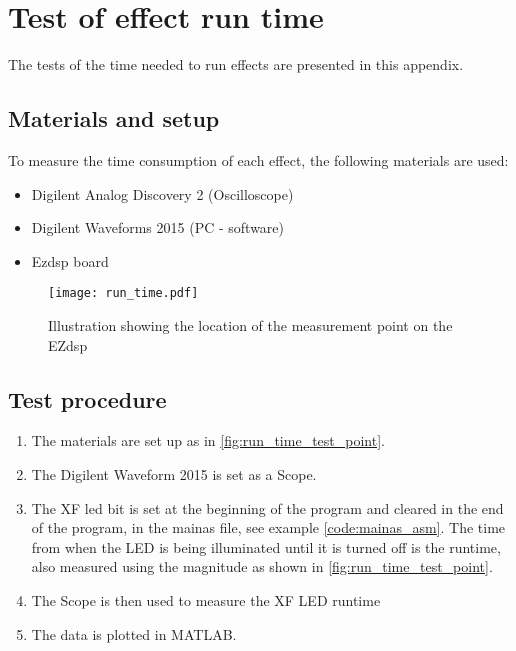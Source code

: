 \chapter{Test of effect run time}\label{app:effect_run_time}

The tests of the time needed to run effects are presented in this appendix.

\section*{Materials and setup}
To measure the time consumption of each effect, the following materials are used:
\begin{itemize}
\item Digilent Analog Discovery 2 (Oscilloscope)
\item Digilent Waveforms 2015 (PC - software)
\item Ezdsp board
\end{itemize}


\begin{figure}[htbp!]
	\centering
		\texttt{[image: run\_time.pdf]}
		\caption{Illustration showing the location of the measurement point on the EZdsp}
		\label{fig:run_time_test_point}
\end{figure}


\section*{Test procedure}
\begin{enumerate}
\item The materials are set up as in \autoref{fig:run_time_test_point}.
\item The Digilent Waveform 2015 is set as a Scope.
\item  The XF led bit is set at the beginning of the program and cleared in the end of the program, in the mainas file, see example \autoref{code:mainas_asm}. The time from when the LED is being illuminated until it is turned off is the runtime, also measured using the magnitude as shown in \autoref{fig:run_time_test_point}. 
\item  The Scope is then used to measure the XF LED runtime 
\item The data is plotted in MATLAB.
\end{enumerate}

